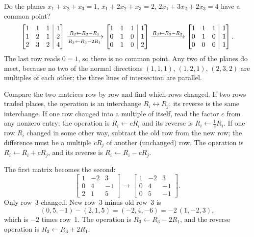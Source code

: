 \documentclass[10pt]{scrartcl}
\makeatletter
\newcommand{\aug}[2]{\left[\begin{array}{@{}#1@{}}#2\end{array}\right]}
\makeatother
\begin{document}
\begin{example*}
Do the planes $x_1+x_2+x_3=1$, $x_1+2x_2+x_3=2$, $2x_1+3x_2+2x_3=4$ have a common point?
\[
  \aug{rrr|r}{1&1&1&1\\1&2&1&2\\2&3&2&4}
  \xrightarrow[R_3\leftarrow R_3-2R_1]{R_2\leftarrow R_2-R_1}
  \aug{rrr|r}{1&1&1&1\\0&1&0&1\\0&1&0&2}
  \xrightarrow{R_3\leftarrow R_3-R_2}
  \aug{rrr|r}{1&1&1&1\\0&1&0&1\\0&0&0&1}.
\]
The last row reads $0=1$, so there is no common point. Any two of the planes do meet, because no two of the normal directions $(1,1,1)$, $(1,2,1)$, $(2,3,2)$ are multiples of each other; the three lines of intersection are parallel.
\end{example*}

\begin{steps}
  \ii Compare the two matrices row by row and find which rows changed.
  \ii If two rows traded places, the operation is an interchange $R_i\leftrightarrow R_j$; its reverse is the same interchange.
  \ii If one row changed into a multiple of itself, read the factor $c$ from any nonzero entry; the operation is $R_i\leftarrow cR_i$ and its reverse is $R_i\leftarrow \tfrac1c R_i$.
  \ii If one row $R_i$ changed in some other way, subtract the old row from the new row; the difference must be a multiple $cR_j$ of another (unchanged) row. The operation is $R_i\leftarrow R_i+cR_j$, and its reverse is $R_i\leftarrow R_i-cR_j$.
\end{steps}

\begin{example*}
The first matrix becomes the second:
\[
  \begin{bmatrix}1&-2&3\\0&4&-1\\2&1&5\end{bmatrix}
  \longrightarrow
  \begin{bmatrix}1&-2&3\\0&4&-1\\0&5&-1\end{bmatrix}.
\]
Only row~3 changed. New row~3 minus old row~3 is
\[
  (0,5,-1)-(2,1,5)=(-2,4,-6)=-2\,(1,-2,3),
\]
which is $-2$ times row~1. The operation is $R_3\leftarrow R_3-2R_1$, and the reverse operation is $R_3\leftarrow R_3+2R_1$.
\end{example*}
\end{document}
